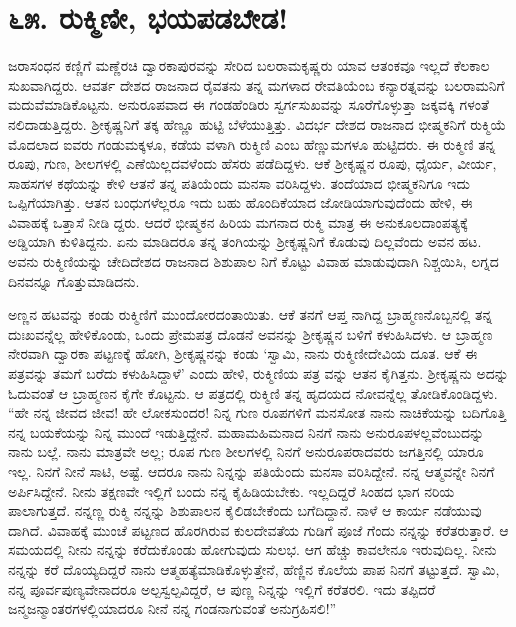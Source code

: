 
\chapter{೬೫. ರುಕ್ಮಿಣೀ, ಭಯಪಡಬೇಡ!}

ಜರಾಸಂಧನ ಕಣ್ಣಿಗೆ ಮಣ್ಣೆರಚಿ ದ್ವಾರಕಾಪುರವನ್ನು ಸೇರಿದ ಬಲರಾಮಕೃಷ್ಣರು ಯಾವ ಆತಂಕವೂ ಇಲ್ಲದೆ ಕೆಲಕಾಲ ಸುಖವಾಗಿದ್ದರು. ಆವರ್ತ ದೇಶದ ರಾಜನಾದ ರೈವತನು ತನ್ನ ಮಗಳಾದ ರೇವತಿಯೆಂಬ ಕನ್ಯಾರತ್ನವನ್ನು ಬಲರಾಮನಿಗೆ ಮದುವೆಮಾಡಿಕೊಟ್ಟನು. ಅನುರೂಪವಾದ ಈ ಗಂಡಹೆಂಡಿರು ಸ್ವರ್ಗಸುಖವನ್ನು ಸೂರೆಗೊಳ್ಳುತ್ತಾ ಜಕ್ಕವಕ್ಕಿ ಗಳಂತೆ ನಲಿದಾಡುತ್ತಿದ್ದರು. ಶ್ರೀಕೃಷ್ಣನಿಗೆ ತಕ್ಕ ಹೆಣ್ಣೂ ಹುಟ್ಟಿ ಬೆಳೆಯುತ್ತಿತ್ತು. ವಿದರ್ಭ ದೇಶದ ರಾಜನಾದ ಭೀಷ್ಮಕನಿಗೆ ರುಕ್ಮಿಯೆ ಮೊದಲಾದ ಐವರು ಗಂಡುಮಕ್ಕಳೂ, ಕಡೆಯ ವಳಾಗಿ ರುಕ್ಮಿಣಿ ಎಂಬ ಹೆಣ್ಣುಮಗಳೂ ಹುಟ್ಟಿದರು. ಈ ರುಕ್ಮಿಣಿ ತನ್ನ ರೂಪು, ಗುಣ, ಶೀಲಗಳಲ್ಲಿ ಎಣೆಯಿಲ್ಲದವಳೆಂದು ಹೆಸರು ಪಡೆದಿದ್ದಳು. ಆಕೆ ಶ್ರೀಕೃಷ್ಣನ ರೂಪು, ಧೈರ್ಯ, ವೀರ್ಯ, ಸಾಹಸಗಳ ಕಥೆಯನ್ನು ಕೇಳಿ ಆತನೆ ತನ್ನ ಪತಿಯೆಂದು ಮನಸಾ ವರಿಸಿದ್ದಳು. ತಂದೆಯಾದ ಭೀಷ್ಮಕನಿಗೂ ಇದು ಒಪ್ಪಿಗೆಯಾಗಿತ್ತು. ಆತನ ಬಂಧುಗಳೆಲ್ಲರೂ ಇದು ಬಹು ಹೊಂದಿಕೆಯಾದ ಜೋಡಿಯಾಗುವುದೆಂದು ಹೇಳಿ, ಈ ವಿವಾಹಕ್ಕೆ ಒತ್ತಾಸೆ ನೀಡಿ ದ್ದರು. ಆದರೆ ಭೀಷ್ಮಕನ ಹಿರಿಯ ಮಗನಾದ ರುಕ್ಮಿ ಮಾತ್ರ ಈ ಅನುಕೂಲದಾಂಪತ್ಯಕ್ಕೆ ಅಡ್ಡಿಯಾಗಿ ಕುಳಿತಿದ್ದನು. ಏನು ಮಾಡಿದರೂ ತನ್ನ ತಂಗಿಯನ್ನು ಶ್ರೀಕೃಷ್ಣನಿಗೆ ಕೊಡುವು ದಿಲ್ಲವೆಂದು ಅವನ ಹಟ. ಅವನು ರುಕ್ಮಿಣಿಯನ್ನು ಚೇದಿದೇಶದ ರಾಜನಾದ ಶಿಶುಪಾಲ ನಿಗೆ ಕೊಟ್ಟು ವಿವಾಹ ಮಾಡುವುದಾಗಿ ನಿಶ್ಚಯಿಸಿ, ಲಗ್ನದ ದಿನವನ್ನೂ ಗೊತ್ತುಮಾಡಿದನು.

ಅಣ್ಣನ ಹಟವನ್ನು ಕಂಡು ರುಕ್ಮಿಣಿಗೆ ಮುಂದೋರದಂತಾಯಿತು. ಆಕೆ ತನಗೆ ಆಪ್ತ ನಾಗಿದ್ದ ಬ್ರಾಹ್ಮಣನೊಬ್ಬನಲ್ಲಿ ತನ್ನ ದುಃಖವನ್ನೆಲ್ಲ ಹೇಳಿಕೊಂಡು, ಒಂದು ಪ್ರೇಮಪತ್ರ ದೊಡನೆ ಅವನನ್ನು ಶ್ರೀಕೃಷ್ಣನ ಬಳಿಗೆ ಕಳುಹಿಸಿದಳು. ಆ ಬ್ರಾಹ್ಮಣ ನೇರವಾಗಿ ದ್ವಾರಕಾ ಪಟ್ಟಣಕ್ಕೆ ಹೋಗಿ, ಶ್ರೀಕೃಷ್ಣನನ್ನು ಕಂಡು ‘ಸ್ವಾಮಿ, ನಾನು ರುಕ್ಮಿಣೀದೇವಿಯ ದೂತ. ಆಕೆ ಈ ಪತ್ರವನ್ನು ತಮಗೆ ಬರೆದು ಕಳುಹಿಸಿದ್ದಾಳೆ’ ಎಂದು ಹೇಳಿ, ರುಕ್ಮಿಣಿಯ ಪತ್ರ ವನ್ನು ಆತನ ಕೈಗಿತ್ತನು. ಶ್ರೀಕೃಷ್ಣನು ಅದನ್ನು ಓದುವಂತೆ ಆ ಬ್ರಾಹ್ಮಣನ ಕೈಗೇ ಕೊಟ್ಟನು. ಆ ಪತ್ರದಲ್ಲಿ ರುಕ್ಮಿಣಿ ತನ್ನ ಹೃದಯದ ನೋವನ್ನೆಲ್ಲ ತೋಡಿಕೊಂಡಿದ್ದಳು. “ಹೇ ನನ್ನ ಜೀವದ ಜೀವ! ಹೇ ಲೋಕಸುಂದರ! ನಿನ್ನ ಗುಣ ರೂಪಗಳಿಗೆ ಮನಸೋತ ನಾನು ನಾಚಿಕೆಯನ್ನು ಬದಿಗೊತ್ತಿ ನನ್ನ ಬಯಕೆಯನ್ನು ನಿನ್ನ ಮುಂದೆ ಇಡುತ್ತಿದ್ದೇನೆ. ಮಹಾಮಹಿಮನಾದ ನಿನಗೆ ನಾನು ಅನುರೂಪಳಲ್ಲವೆಂಬುದನ್ನು ನಾನು ಬಲ್ಲೆ. ನಾನು ಮಾತ್ರವೇ ಅಲ್ಲ; ರೂಪ ಗುಣ ಶೀಲಗಳಲ್ಲಿ ನಿನಗೆ ಅನುರೂಪರಾದವರು ಜಗತ್ತಿನಲ್ಲಿ ಯಾರೂ ಇಲ್ಲ. ನಿನಗೆ ನೀನೆ ಸಾಟಿ, ಅಷ್ಟೆ. ಆದರೂ ನಾನು ನಿನ್ನನ್ನು ಪತಿಯೆಂದು ಮನಸಾ ವರಿಸಿದ್ದೇನೆ. ನನ್ನ ಆತ್ಮವನ್ನೇ ನಿನಗೆ ಅರ್ಪಿಸಿದ್ದೇನೆ. ನೀನು ತಕ್ಷಣವೇ ಇಲ್ಲಿಗೆ ಬಂದು ನನ್ನ ಕೈಹಿಡಿಯಬೇಕು. ಇಲ್ಲದಿದ್ದರೆ ಸಿಂಹದ ಭಾಗ ನರಿಯ ಪಾಲಾಗುತ್ತದೆ. ನನ್ನಣ್ಣ ರುಕ್ಮಿ ನನ್ನನ್ನು ಶಿಶುಪಾಲನ ಕೈಲಿಡಬೇಕೆಂದು ಬಗೆದಿದ್ದಾನೆ. ನಾಳೆ ಆ ಕಾರ್ಯ ನಡೆಯುವು ದಾಗಿದೆ. ವಿವಾಹಕ್ಕೆ ಮುಂಚೆ ಪಟ್ಟಣದ ಹೊರಗಿರುವ ಕುಲದೇವತೆಯ ಗುಡಿಗೆ ಪೂಜೆ ಗೆಂದು ನನ್ನನ್ನು ಕರೆತರುತ್ತಾರೆ. ಆ ಸಮಯದಲ್ಲಿ ನೀನು ನನ್ನನ್ನು ಕರೆದುಕೊಂಡು ಹೋಗುವುದು ಸುಲಭ. ಆಗ ಹೆಚ್ಚು ಕಾವಲೇನೂ ಇರುವುದಿಲ್ಲ. ನೀನು ನನ್ನನ್ನು ಕರೆ ದೊಯ್ಯದಿದ್ದರೆ ನಾನು ಆತ್ಮಹತ್ಯೆಮಾಡಿಕೊಳ್ಳುತ್ತೇನೆ, ಹೆಣ್ಣಿನ ಕೊಲೆಯ ಪಾಪ ನಿನಗೆ ತಟ್ಟುತ್ತದೆ. ಸ್ವಾಮಿ, ನನ್ನ ಪೂರ್ವಪುಣ್ಯವೇನಾದರೂ ಅಲ್ಪಸ್ವಲ್ಪವಿದ್ದರೆ, ಆ ಪುಣ್ಣ ನಿನ್ನನ್ನು ಇಲ್ಲಿಗೆ ಕರೆತರಲಿ. ಇದು ತಪ್ಪಿದರೆ ಜನ್ಮಜನ್ಮಾಂತರಗಳಲ್ಲಿಯಾದರೂ ನೀನೆ ನನ್ನ ಗಂಡನಾಗುವಂತೆ ಅನುಗ್ರಹಿಸಲಿ!”

